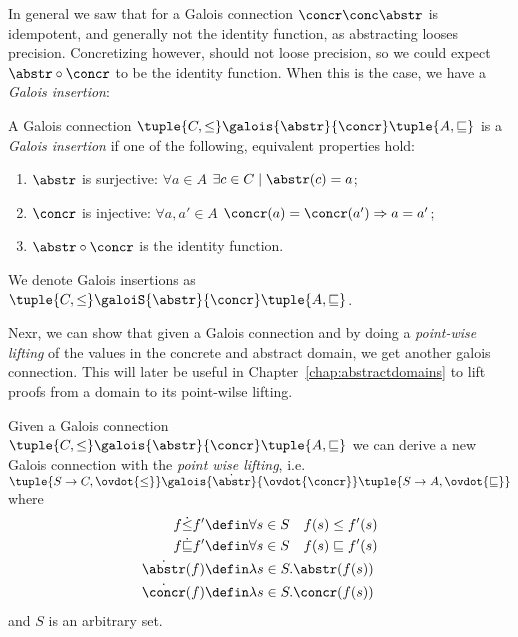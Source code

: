 In general we saw that for a Galois connection \(\concr \conc \abstr\)
is idempotent, and generally not the identity function, as abstracting
looses precision. Concretizing however, should not loose precision, so
we could expect \(\abstr \circ \concr\) to be the identity
function. When this is the case, we have a \emph{Galois insertion}:

\begin{definition}\label{def:insertion}
  A Galois
  connection \(\tuple{C, \leq} \galois{\abstr}{\concr} \tuple{A,
    \sqsubseteq}\) is a \emph{Galois insertion} if one of the
  following, equivalent properties hold:
  \begin{enumerate}
  \item \(\abstr\) is surjective: \(\forall a \in A\)
    \(\exists c \in C \mid \abstr(c) = a\);
  \item \(\concr\) is injective: \(\forall a, a'\in A\)
    \(\concr(a) = \concr(a') \Rightarrow a = a'\);
  \item \(\abstr \circ \concr\) is the identity function.
  \end{enumerate}
  We denote Galois insertions as
  \(\tuple{C, \leq} \galoiS{\abstr}{\concr} \tuple{A, \sqsubseteq}\).
\end{definition}

Nexr, we can show that given a Galois connection and by doing a
\emph{point-wise lifting} of the values in the concrete and abstract
domain, we get another galois connection. This will later be useful in
Chapter~\ref{chap:abstractdomains} to lift proofs from a domain to its
point-wilse lifting.

\begin{theorem}\label{th:pointwiseconn}
  Given a Galois connection
  \(\tuple{C, \leq} \galois{\abstr}{\concr} \tuple{A, \sqsubseteq}\)
  we can derive a new Galois connection with the \emph{point wise
    lifting}, i.e.
  \(\tuple{S\to C, \ovdot{\leq}} \galois{\dot\abstr}{\ovdot{\concr}}
  \tuple{S\to A, \ovdot{\sqsubseteq}}\) where
  \begin{align*}
    f \dot\leq f' & \defin \forall s \in S \quad f(s) \leq f'(s)\\
    f \dot\sqsubseteq f' & \defin \forall s \in S \quad f(s) \sqsubseteq f'(s)\\
    \dot\abstr(f) & \defin \lambda s \in S . \abstr(f(s)) \\
    \dot\concr(f) & \defin \lambda s \in S . \concr(f(s)) \\
  \end{align*}
  and \(S\) is an arbitrary set.
\end{theorem}

